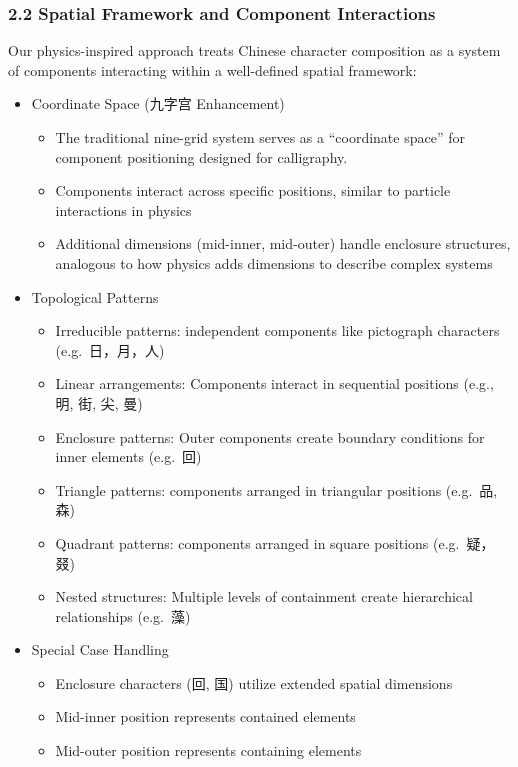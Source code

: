 \documentclass[
]{article}
\providecommand{\tightlist}{%
  \setlength{\itemsep}{0pt}\setlength{\parskip}{0pt}}
\begin{document}
\subsubsection{2.2 Spatial Framework and Component
Interactions}\label{spatial-framework-and-component-interactions}

Our physics-inspired approach treats Chinese character composition as a
system of components interacting within a well-defined spatial
framework:

\begin{itemize}
\tightlist
\item
  Coordinate Space (九字宫 Enhancement)

  \begin{itemize}
  \tightlist
  \item
    The traditional nine-grid system serves as a ``coordinate space''
    for component positioning designed for calligraphy.
  \item
    Components interact across specific positions, similar to particle
    interactions in physics
  \item
    Additional dimensions (mid-inner, mid-outer) handle enclosure
    structures, analogous to how physics adds dimensions to describe
    complex systems
  \end{itemize}
\item
  Topological Patterns

  \begin{itemize}
  \tightlist
  \item
    Irreducible patterns: independent components like pictograph
    characters (e.g.~日，月，人)
  \item
    Linear arrangements: Components interact in sequential positions
    (e.g., 明, 街, 尖, 曼)
  \item
    Enclosure patterns: Outer components create boundary conditions for
    inner elements (e.g.~回)
  \item
    Triangle patterns: components arranged in triangular positions
    (e.g.~品, 森)
  \item
    Quadrant patterns: components arranged in square positions
    (e.g.~疑，叕)
  \item
    Nested structures: Multiple levels of containment create
    hierarchical relationships (e.g.~藻)
  \end{itemize}
\item
  Special Case Handling

  \begin{itemize}
  \tightlist
  \item
    Enclosure characters (回, 国) utilize extended spatial dimensions
  \item
    Mid-inner position represents contained elements
  \item
    Mid-outer position represents containing elements
  \end{itemize}
\end{itemize}
\end{document}
